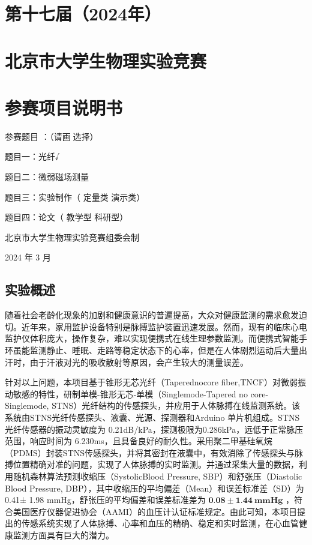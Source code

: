\documentclass[
  10
]{article}
\author{}
\date{}
\begin{document}
\section{第十七届（2024年）}\label{ux7b2cux5341ux4e03ux5c4a2024ux5e74}

\section{北京市大学生物理实验竞赛}\label{ux5317ux4eacux5e02ux5927ux5b66ux751fux7269ux7406ux5b9eux9a8cux7adeux8d5b}

\section{参赛项目说明书}\label{ux53c2ux8d5bux9879ux76eeux8bf4ux660eux4e66}

参赛题目 ：（请画选择）

题目一：光纤√

题目二：微弱磁场测量

题目三：实验制作（ 定量类 演示类）

题目四：论文（ 教学型 科研型）

北京市大学生物理实验竞赛组委会制

2024 年 3 月

\subsection{实验概述}\label{ux5b9eux9a8cux6982ux8ff0}

随着社会老龄化现象的加剧和健康意识的普遍提高，大众对健康监测的需求愈发迫切。近年来，家用监护设备特别是脉搏监护装置迅速发展。然而，现有的临床心电监护仪体积庞大，操作复杂，难以实现便携式在线生理参数监测。而便携式智能手环虽能监测静止、睡眠、走路等稳定状态下的心率，但是在人体剧烈运动后大量出汗时，由于汗液对光的吸收散射等原因，会产生较大的测量误差。

针对以上问题，本项目基于锥形无芯光纤（Taperednocore
fiber,TNCF）对微弱振动敏感的特性，研制单模-锥形无芯-单模（Singlemode-Tapered
no core-Singlemode,
STNS）光纤结构的传感探头，并应用于人体脉搏在线监测系统。该系统由STNS光纤传感探头、液囊、光源、探测器和Arduino
单片机组成。STNS 光纤传感器的振动灵敏度为
0.21dB/kPa，探测极限为0.286kPa，远低于正常脉压范围，响应时间为
6.230ms，且具备良好的耐久性。采用聚二甲基硅氧烷（PDMS）封装STNS传感探头，并将其密封在液囊中，有效消除了传感探头与脉搏位置精确对准的问题，实现了人体脉搏的实时监测。并通过采集大量的数据，利用随机森林算法预测收缩压（SystolicBlood
Pressure, SBP）和舒张压（Diastolic Blood Pressure,
DBP），其中收缩压的平均偏差（Mean）和误差标准差（SD）为 0.41± 1.98
mmHg，舒张压的平均偏差和误差标准差为
\(\mathbf { 0 . 0 8 \pm 1 . 4 4 ~ m m H g }\)
，符合美国医疗仪器促进协会（AAMI）的血压计认证标准规定。由此可知，本项目提出的传感系统实现了人体脉搏、心率和血压的精确、稳定和实时监测，在心血管健康监测方面具有巨大的潜力。
\end{document}
